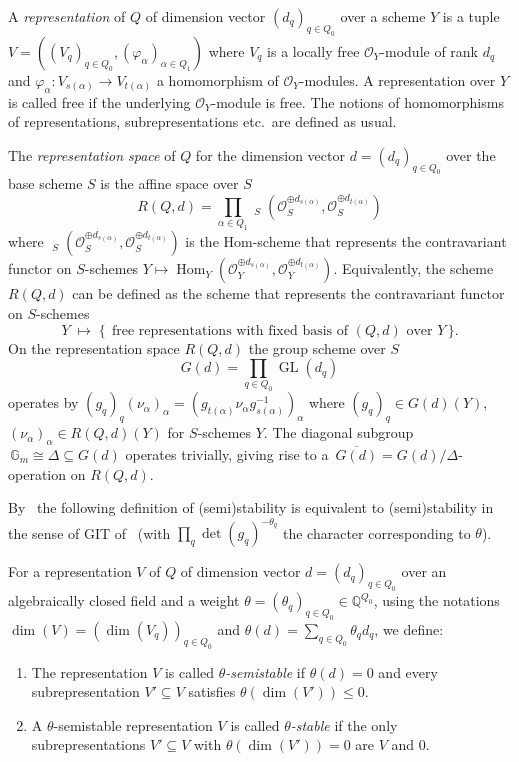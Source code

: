 \documentclass[ALCO,ThmDefs,Unicode,epreuves]{cedram}
\def\Q{\mathds Q}
\def\phi{\varphi}
\def\G{\mathds G}
\def\O{\mathcal O}
\DeclareMathOperator{\Hom}{Hom}
\DeclareMathOperator{\UHom}{\underline{Hom}}
\DeclareMathOperator{\GL}{GL}
\begin{document}
\begin{defi}
A {\it representation} of $Q$ of dimension vector $(d_q)_{q\in Q_0}$ over 
a scheme $Y$ is a tuple $V=((V_q)_{q\in Q_0},(\phi_\alpha)_{\alpha\in Q_1})$ 
where $V_q$ is a locally free $\O_Y$-module of rank $d_q$ and
$\phi_\alpha\colon V_{s(\alpha)}\to V_{t(\alpha)}$ a homomorphism of 
$\O_Y$-modules. A representation over $Y$ is called free if the underlying
$\O_Y$-module is free. The notions of homomorphisms of representations,
subrepresentations etc.\ are defined as usual.
\end{defi}

\begin{defi}
The {\it representation space} of $Q$ for the dimension vector $d=(d_q)_{q\in Q_0}$
over the base scheme $S$ is the affine space over $S$
\[
R(Q,d)=\prod_{\alpha\in Q_1}\UHom_S(\O_S^{\oplus d_{s(\alpha)}},
\O_S^{\oplus d_{t(\alpha)}})
\]
where $\UHom_S(\O_S^{\oplus d_{s(\alpha)}},\O_S^{\oplus d_{t(\alpha)}})$ 
is the Hom-scheme that represents the contravariant functor on $S$-schemes
$Y\mapsto\Hom_Y(\O_Y^{\oplus d_{s(\alpha)}},\O_Y^{\oplus d_{t(\alpha)}})$.
Equivalently, the scheme $R(Q,d)$ can be defined as the scheme that represents 
the contravariant functor on $S$-schemes
\[
Y\;\mapsto\;\big\{\;\,\text{free representations with fixed basis of $(Q,d)$ 
over $Y$}\,\big\}.
\]
On the representation space $R(Q,d)$ the group scheme over $S$
\[
G(d)=\prod_{q\in Q_0}\GL(d_q)
\]
operates by $(g_q)_q(\nu_\alpha)_\alpha=(g_{t(\alpha)}\nu_\alpha 
g_{s(\alpha)}^{-1})_\alpha$ where $(g_q)_q\in G(d)(Y)$,
$(\nu_\alpha)_\alpha\in R(Q,d)(Y)$ for $S$-schemes $Y$.
The diagonal subgroup $\,\G_m\cong\Delta\subseteq G(d)$ operates trivially, 
giving rise to a $\,\overline{G(d)}=G(d)/\Delta$-operation on $R(Q,d)$.
\end{defi}

By~\cite{Ki94} the following definition of (semi)stability is equivalent to 
(semi)stability in the sense of GIT of~\cite{MFK} (with $\prod_q\det(g_q)^{-\theta_q}$
the character corresponding to $\theta$).

\begin{defi}
For a representation $V$ of $Q$ of dimension vector $d=(d_q)_{q\in Q_0}$
over an algebraically closed field and a weight 
$\theta=(\theta_q)_{q\in Q_0}\in\Q^{Q_0}$, using the notations
$\dim(V)=(\dim(V_q))_{q\in Q_0}$ and $\theta(d)=\sum_{q\in Q_0}\theta_qd_q$, 
we define: %

\begin{enumerate}[label=(\alph*)]
\item \label{defi1.3_a}
The representation $V$ is called {\it $\theta$-semistable} if
$\theta(d)=0$ and every subrepresentation $V'\subseteq V$ satisfies 
$\theta(\dim(V'))\leq 0$. %

\item \label{defi1.3_b}
A $\theta$-semistable representation $V$ is called {\it $\theta$-stable} if 
the only subrepresentations $V'\subseteq V$ with $\theta(\dim(V'))=0$ are $V$ and $0$.
\end{enumerate}
\end{defi}
\end{document}
